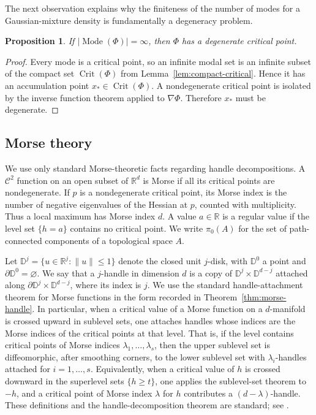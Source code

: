 \documentclass[11pt]{article}
\theoremstyle{plain}
\newtheorem{proposition}[theorem]{Proposition}
\theoremstyle{definition}
\theoremstyle{remark}
\numberwithin{equation}{section}
\DeclareMathOperator{\Crit}{Crit}
\DeclareMathOperator{\Mode}{Mode}
\newcommand{\R}{\mathbb{R}}
\begin{document}
The next observation explains why the finiteness of the number of modes for a Gaussian-mixture density is fundamentally a degeneracy problem.

\begin{proposition}\label{prop:degeneracy-obstruction}
If $|\Mode(\Phi)|=\infty$, then $\Phi$ has a degenerate critical point.
\end{proposition}

\begin{proof}
Every mode is a critical point, so an infinite modal set is an infinite subset of the compact set $\Crit(\Phi)$ from Lemma~\ref{lem:compact-critical}. Hence it has an accumulation point $x_\ast\in\Crit(\Phi)$. A nondegenerate critical point is isolated by the inverse function theorem applied to $\nabla\Phi$. Therefore $x_\ast$ must be degenerate.
\end{proof}

\subsection{Morse theory}\label{subsec:morse-terminology}

We use only standard Morse-theoretic facts regarding handle decompositions. A $\mathcal{C}^2$ function on an open subset of $\R^d$ is Morse if all its critical points are nondegenerate. If $p$ is a nondegenerate critical point, its Morse index is the number of negative eigenvalues of the Hessian at $p$, counted with multiplicity. Thus a local maximum has Morse index $d$. A value $a\in\R$ is a regular value if the level set $\{h=a\}$ contains no critical point. We write $\pi_0(A)$ for the set of path-connected components of a topological space $A$.

Let $\mathbb D^j=\{u\in\R^j:\|u\|\le1\}$ denote the closed unit $j$-disk, with $\mathbb D^0$ a point and $\partial\mathbb D^0=\varnothing$. We say that a $j$-handle in dimension $d$ is a copy of $\mathbb D^j\times \mathbb D^{d-j}$ attached along $\partial \mathbb D^j\times \mathbb D^{d-j}$, where its index is $j$. We use the standard handle-attachment theorem for Morse functions in the form recorded in Theorem~\ref{thm:morse-handle}. In particular, when a critical value of a Morse function on a $d$-manifold is crossed upward in sublevel sets, one attaches handles whose indices are the Morse indices of the critical points at that level. That is, if the level contains critical points of Morse indices $\lambda_1,\dots,\lambda_s$, then the upper sublevel set is diffeomorphic, after smoothing corners, to the lower sublevel set with $\lambda_i$-handles attached for $i=1,\dots,s$. Equivalently, when a critical value of $h$ is crossed downward in the superlevel sets $\{h\ge t\}$, one applies the sublevel-set theorem to $-h$, and a critical point of Morse index $\lambda$ for $h$ contributes a $(d-\lambda)$-handle. These definitions and the handle-decomposition theorem are standard; see \citet[Chapters~1--3]{Knudson2015}.
\end{document}
